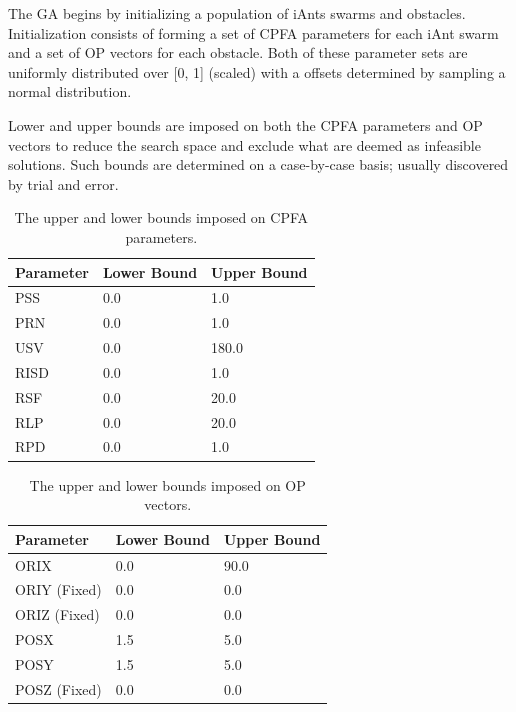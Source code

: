 \documentclass{acm_proc_article-sp}
\begin{document}
The GA begins by initializing a population of iAnts swarms and obstacles. Initialization consists of forming a set of CPFA parameters for each iAnt swarm and a set of OP vectors for each obstacle. Both of these parameter sets are uniformly distributed over [0, 1] (scaled) with a offsets determined by sampling a normal distribution.

Lower and upper bounds are imposed on both the CPFA parameters and OP vectors to reduce the search space and exclude what are deemed as infeasible solutions. Such bounds are determined on a case-by-case basis; usually discovered by trial and error.

\begin{table}[h]
\begin{tabular}{@{}lll@{}}
\toprule
Parameter & Lower Bound & Upper Bound \\ \midrule
PSS       & 0.0         & 1.0         \\
PRN       & 0.0         & 1.0         \\
USV       & 0.0         & 180.0       \\
RISD      & 0.0         & 1.0         \\
RSF       & 0.0         & 20.0        \\
RLP       & 0.0         & 20.0        \\
RPD       & 0.0         & 1.0         \\ \bottomrule
\end{tabular}
\caption{The upper and lower bounds imposed on CPFA parameters.} \label{table:cpfaBounds}
\end{table}

\begin{table}[h]
\begin{tabular}{@{}lll@{}}
\toprule
Parameter    & Lower Bound & Upper Bound \\ \midrule
ORIX         & 0.0         & 90.0        \\
ORIY (Fixed) & 0.0         & 0.0         \\
ORIZ (Fixed) & 0.0         & 0.0         \\
POSX         & 1.5         & 5.0         \\
POSY         & 1.5         & 5.0         \\
POSZ (Fixed) & 0.0         & 0.0         \\ \bottomrule
\end{tabular}
\caption{The upper and lower bounds imposed on OP vectors.} \label{table:opBounds}
\end{table}
\end{document}
